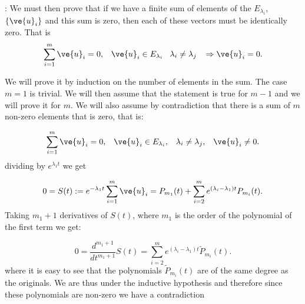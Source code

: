\pru:
We must then prove that if we have a finite sum of elements of
the $E_{\lambda_i}$, $\{\ve{u}_i\}$ and this sum is zero, then each of
these vectors must be identically zero. 
That is
\begin{equation}
  \label{eq:indep_lineal_E_lambda}
  \sum_{i=1}^{m} \ve{u}_i = 0, \;\;\; \ve{u}_i \in E_{\lambda_i}\;\;\; 
  \lambda_i \neq \lambda_j \;\;\; \Rightarrow \ve{u}_i = 0.
\end{equation}

We will prove it by induction on the number of elements in the sum.
The case $m=1$ is trivial. We will then assume that the statement is
true for $m-1$ and we will prove it for $m$.
We will also assume by contradiction that there is a sum of $m$
non-zero elements that is zero, that is:

\begin{equation}
  \label{eq:indep_lineal_E_lambda_2}
  \sum_{i=1}^{m} \ve{u}_i = 0, \;\;\; \ve{u}_i \in E_{\lambda_i},\;\;\; 
  \lambda_i \neq \lambda_j, \;\;\;\ve{u}_i \neq 0.
\end{equation}
%
dividing by $e^{\lambda_1 t}$ we get

\begin{equation}
  \label{eq:indep_lineal_E_lambda_3}
 0 = S(t) := e^{-\lambda_1 t}\sum_{i=1}^{m} \ve{u}_i 
           = P_{m_1}(t) + \sum_{i=2}^{m} e^{(\lambda_i-\lambda_1) t} P_{m_i}(t).
\end{equation}
%
Taking $m_1+1$ derivatives of $S(t)$, where $m_1$ is the order of the polynomial
of the first term we get:

\begin{equation}
  \label{eq:indep_lineal_E_lambda_4}
 0 = \frac{d^{m_1+1}}{dt^{m_1+1}} S(t) 
   =  \sum_{i=2}^{m} e^{(\lambda_i-\lambda_1) t} \tilde{P}_{m_i}(t).
\end{equation}
%
where it is easy to see that the polynomials $\tilde{P}_{m_i}(t)$ are of the same
degree as the originals. We are thus under the inductive hypothesis 
and therefore since these polynomials are non-zero we have a contradiction
\epru
\espa

